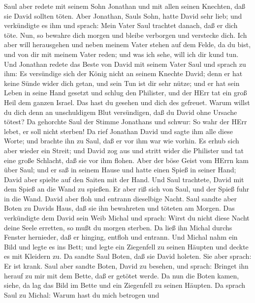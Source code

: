  Saul aber redete mit seinem Sohn Jonathan und mit allen
seinen Knechten, daß sie David sollten töten. Aber Jonathan, Sauls Sohn,
hatte David sehr lieb;  und verkündigte es ihm und sprach:
Mein Vater Saul trachtet danach, daß er dich töte. Nun, so bewahre dich
morgen und bleibe verborgen und verstecke dich.  Ich aber
will herausgehen und neben meinem Vater stehen auf dem Felde, da du
bist, und von dir mit meinem Vater reden; und was ich sehe, will ich dir
kund tun.  Und Jonathan redete das Beste von David mit
seinem Vater Saul und sprach zu ihm: Es versündige sich der König nicht
an seinem Knechte David; denn er hat keine Sünde wider dich getan, und
sein Tun ist dir sehr nütze;  und er hat sein Leben in seine
Hand gesetzt und schlug den Philister, und der HErr tat ein groß Heil
dem ganzen Israel. Das hast du gesehen und dich des gefreuet. Warum
willst du dich denn an unschuldigem Blut versündigen, daß du David ohne
Ursache tötest?  Da gehorchte Saul der Stimme Jonathans und
schwur: So wahr der HErr lebet, er soll nicht sterben!  Da
rief Jonathan David und sagte ihm alle diese Worte; und brachte ihn zu
Saul, daß er vor ihm war wie vorhin.  Es erhub sich aber
wieder ein Streit; und David zog aus und stritt wider die Philister und
tat eine große Schlacht, daß sie vor ihm flohen.  Aber der
böse Geist vom HErrn kam über Saul; und er saß in seinem Hause und hatte
einen Spieß in seiner Hand; David aber spielte auf den Saiten mit der
Hand.  Und Saul trachtete, David mit dem Spieß an die Wand
zu spießen. Er aber riß sich von Saul, und der Spieß fuhr in die Wand.
David aber floh und entrann dieselbige Nacht.  Saul sandte
aber Boten zu Davids Haus, daß sie ihn bewahreten und töteten am Morgen.
Das verkündigte dem David sein Weib Michal und sprach: Wirst du nicht
diese Nacht deine Seele erretten, so mußt du morgen sterben.
 Da ließ ihn Michal durchs Fenster hernieder, daß er
hinging, entfloh und entrann.  Und Michal nahm ein Bild und
legte es ins Bett; und legte ein Ziegenfell zu seinen Häupten und deckte
es mit Kleidern zu.  Da sandte Saul Boten, daß sie David
holeten. Sie aber sprach: Er ist krank.  Saul aber sandte
Boten, David zu besehen, und sprach: Bringet ihn herauf zu mir mit dem
Bette, daß er getötet werde.  Da nun die Boten kamen,
siehe, da lag das Bild im Bette und ein Ziegenfell zu seinen Häupten.
 Da sprach Saul zu Michal: Warum hast du mich betrogen und
